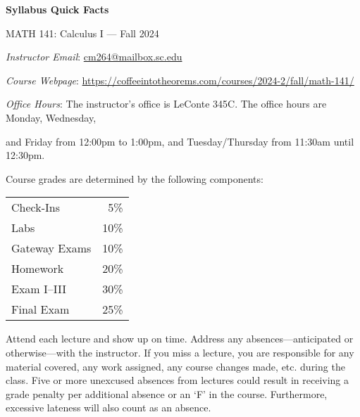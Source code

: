 \documentclass[11pt,letterpaper]{article}
\begin{document}
\begin{center} 
\bfseries
\color{scred}
\LARGE Syllabus Quick Facts \par\vspace{0.2\baselineskip}
\Large MATH 141: Calculus I --- Fall 2024
\end{center} \pspace


\hspace{0.53cm} {\itshape Instructor Email}: \href{mailto:cm264@mailbox.sc.edu}{cm264@mailbox.sc.edu} \par
\hspace{0.53cm} {\itshape Course Webpage}: \href{https://coffeeintotheorems.com/courses/2024-2/fall/math-141/}{https://coffeeintotheorems.com/courses/2024-2/fall/math-141/} \par
\hspace{0.53cm} {\itshape Office Hours}: The instructor's office is LeConte 345C. The office hours are Monday, Wednesday, \par \hspace{0.55cm} and Friday from 12:00pm to 1:00pm, and Tuesday/Thursday from 11:30am until 12:30pm. \pspace


Course grades are determined by the following components: \par \vspace{-0.3cm}
	\begin{table}[!ht]
        \begin{tabular}{lr}
	Check-Ins & 5\% \\
	Labs & 10\% \\
	Gateway Exams & 10\% \\
	Homework & 20\% \\
	Exam I--III & 30\% \\
	Final Exam & 25\%
        \end{tabular} 
        \end{table}


Attend each lecture and show up on time. Address any absences---anticipated or otherwise---with the instructor. If you miss a lecture, you are responsible for any material covered, any work assigned, any course changes made, etc. during the class. Five or more unexcused absences from lectures could result in receiving a grade penalty per additional absence or an `F' in the course. Furthermore, excessive lateness will also count as an absence. 
\pspace
\end{document}
